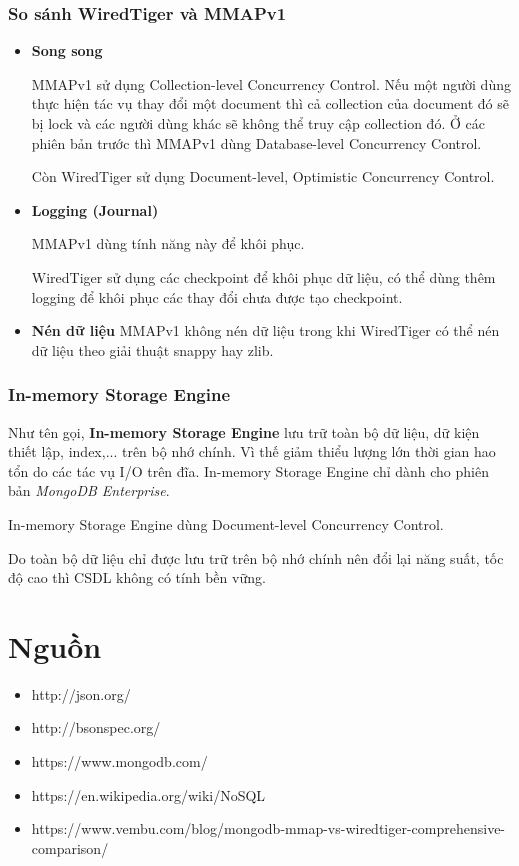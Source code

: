 \subsubsection{So sánh WiredTiger và MMAPv1}
\begin{itemize}
\item \textbf{Song song}

MMAPv1 sử dụng Collection-level Concurrency Control. Nếu một người dùng thực hiện tác vụ thay đổi một document thì cả collection của document đó sẽ bị lock và các người dùng khác sẽ không thể truy cập collection đó. Ở các phiên bản trước thì MMAPv1 dùng Database-level Concurrency Control.

Còn WiredTiger sử dụng Document-level, Optimistic Concurrency Control.
\item \textbf{Logging (Journal)}

MMAPv1 dùng tính năng này để khôi phục.

WiredTiger sử dụng các checkpoint để khôi phục dữ liệu, có thể dùng thêm logging để khôi phục các thay đổi chưa được tạo checkpoint.
\item \textbf{Nén dữ liệu}
MMAPv1 không nén dữ liệu trong khi WiredTiger có thể nén dữ liệu theo giải thuật snappy hay zlib.
\end{itemize}
\subsubsection{In-memory Storage Engine}
Như tên gọi, \textbf{In-memory Storage Engine} lưu trữ toàn bộ dữ liệu, dữ kiện thiết lập, index,... trên bộ nhớ chính. Vì thế giảm thiểu lượng lớn thời gian hao tổn do các tác vụ I/O trên đĩa. In-memory Storage Engine chỉ dành cho phiên bản \textit{MongoDB Enterprise}.

In-memory Storage Engine dùng Document-level Concurrency Control.

Do toàn bộ dữ liệu chỉ được lưu trữ trên bộ nhớ chính nên đổi lại năng suất, tốc độ cao thì CSDL không có tính bền vững.
\section{Nguồn}
\begin{itemize}
\item http://json.org/
\item http://bsonspec.org/
\item https://www.mongodb.com/
\item https://en.wikipedia.org/wiki/NoSQL
\item https://www.vembu.com/blog/mongodb-mmap-vs-wiredtiger-comprehensive-comparison/
\end{itemize}